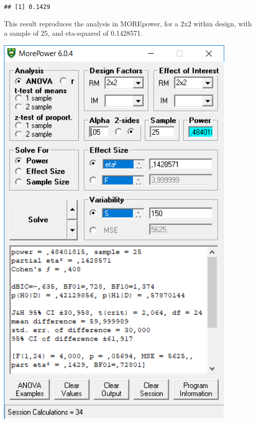 \documentclass[]{book}
\newenvironment{Shaded}{\begin{snugshade}}{\end{snugshade}}
\newcommand{\DecValTok}[1]{\textcolor[rgb]{0.00,0.00,0.81}{#1}}
\newcommand{\NormalTok}[1]{#1}
\newcommand{\OperatorTok}[1]{\textcolor[rgb]{0.81,0.36,0.00}{\textbf{#1}}}
\begin{document}
\begin{Shaded}
\end{Shaded}

\begin{verbatim}
## [1] 0.1429
\end{verbatim}

This result reproduces the analysis in MOREpower, for a 2x2 within design, with a sample of 25, and eta-squared of 0.1428571.

\includegraphics{screenshots/morepower_4.png}
\end{document}
